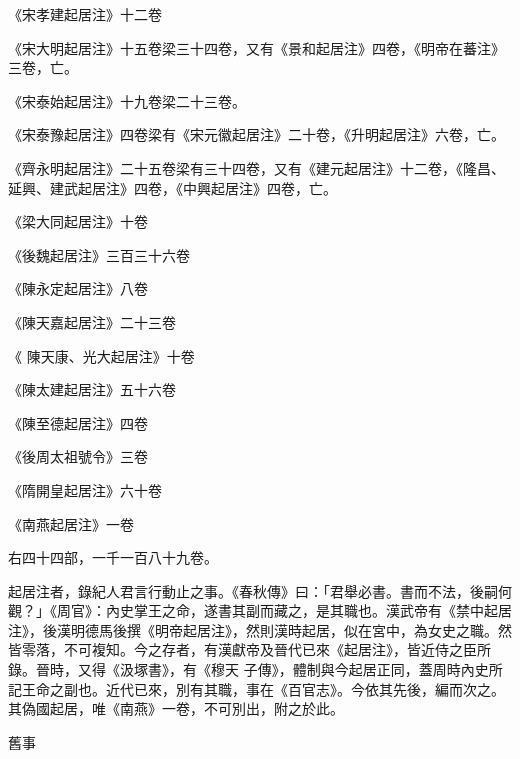 \begin{pinyinscope}
 《宋孝建起居注》十二卷



 《宋大明起居注》十五卷梁三十四卷，又有《景和起居注》四卷，《明帝在蕃注》三卷，亡。



 《宋泰始起居注》十九卷梁二十三卷。



 《宋泰豫起居注》四卷梁有《宋元徽起居注》二十卷，《升明起居注》六卷，亡。



 《齊永明起居注》二十五卷梁有三十四卷，又有《建元起居注》十二卷，《隆昌、延興、建武起居注》四卷，《中興起居注》四卷，亡。



 《梁大同起居注》十卷



 《後魏起居注》三百三十六卷



 《陳永定起居注》八卷



 《陳天嘉起居注》二十三卷



 《
 陳天康、光大起居注》十卷



 《陳太建起居注》五十六卷



 《陳至德起居注》四卷



 《後周太祖號令》三卷



 《隋開皇起居注》六十卷



 《南燕起居注》一卷



 右四十四部，一千一百八十九卷。



 起居注者，錄紀人君言行動止之事。《春秋傳》曰：「君舉必書。書而不法，後嗣何觀？」《周官》：內史掌王之命，遂書其副而藏之，是其職也。漢武帝有《禁中起居注》，後漢明德馬後撰《明帝起居注》，然則漢時起居，似在宮中，為女史之職。然皆零落，不可複知。今之存者，有漢獻帝及晉代已來《起居注》，皆近侍之臣所錄。晉時，又得《汲塚書》，有《穆天
 子傳》，體制與今起居正同，蓋周時內史所記王命之副也。近代已來，別有其職，事在《百官志》。今依其先後，編而次之。其偽國起居，唯《南燕》一卷，不可別出，附之於此。



 舊事




\end{pinyinscope}
